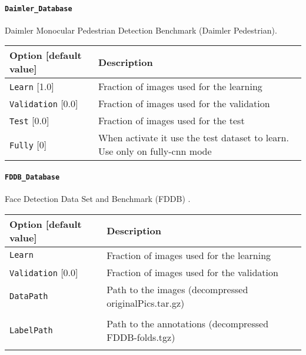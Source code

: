 \documentclass[a4paper,11pt,oneside]{article}
\begin{document}
\paragraph{\texorpdfstring{%
\lstinline[basicstyle=\ttfamily\bfseries]!Daimler_Database!}{Daimler\_Database}}
Daimler Monocular Pedestrian Detection Benchmark (Daimler Pedestrian).

\begin{center}
 \begin{tabular}{| p{5cm} | p{10cm} | }
 \hline
 Option [default value] & Description\\
 \hline\hline
  \cellcolor{requiredcolor}
  \lstinline!Learn! [1.0] & Fraction of images used for the learning \\
  \lstinline!Validation! [0.0] & Fraction of images used for the validation \\
  \lstinline!Test! [0.0] & Fraction of images used for the test \\
  \lstinline!Fully! [0] & When activate it use the test dataset to learn.
  Use only on fully-cnn mode\\
 \hline
\end{tabular}
\end{center}

\paragraph{\texorpdfstring{%
\lstinline[basicstyle=\ttfamily\bfseries]!FDDB_Database!}{FDDB\_Database}}
Face Detection Data Set and Benchmark (FDDB) \citep{Jain2010}.

\begin{center}
 \begin{tabular}{| p{5cm} | p{10cm} | }
 \hline
 Option [default value] & Description\\
 \hline\hline
  \cellcolor{requiredcolor}
  \lstinline!Learn! & Fraction of images used for the learning \\
  \lstinline!Validation! [0.0] & Fraction of images used for the validation \\
  \lstinline!DataPath! & Path to the images
  (decompressed originalPics.tar.gz) \\
   & \\
  \lstinline!LabelPath! & Path to the annotations
  (decompressed FDDB-folds.tgz) \\
  \noindent [\lstinline!$N2D2_DATA!/FDDB] & \\
 \hline
\end{tabular}
\end{center}
\end{document}
